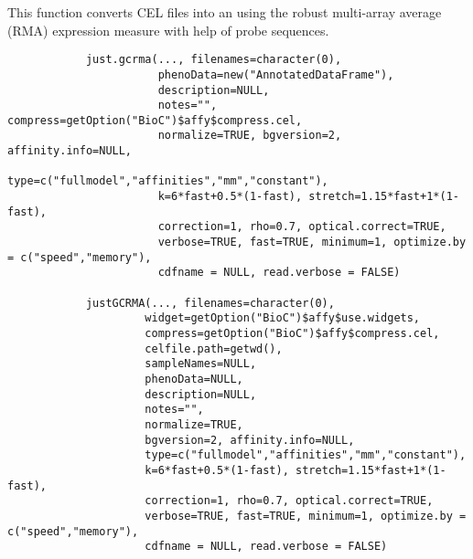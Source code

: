 \begin{Description}\relax
This function converts CEL files into an 
using the robust multi-array average (RMA) expression measure with help of probe sequences.
\end{Description}
\begin{Usage}
\begin{verbatim}
            just.gcrma(..., filenames=character(0),
                       phenoData=new("AnnotatedDataFrame"),
                       description=NULL,
                       notes="", compress=getOption("BioC")$affy$compress.cel,
                       normalize=TRUE, bgversion=2, affinity.info=NULL,
                       type=c("fullmodel","affinities","mm","constant"),
                       k=6*fast+0.5*(1-fast), stretch=1.15*fast+1*(1-fast),
                       correction=1, rho=0.7, optical.correct=TRUE,
                       verbose=TRUE, fast=TRUE, minimum=1, optimize.by = c("speed","memory"),
                       cdfname = NULL, read.verbose = FALSE)

            justGCRMA(..., filenames=character(0),
                     widget=getOption("BioC")$affy$use.widgets,
                     compress=getOption("BioC")$affy$compress.cel,
                     celfile.path=getwd(),
                     sampleNames=NULL,
                     phenoData=NULL,
                     description=NULL,
                     notes="",
                     normalize=TRUE, 
                     bgversion=2, affinity.info=NULL,
                     type=c("fullmodel","affinities","mm","constant"),
                     k=6*fast+0.5*(1-fast), stretch=1.15*fast+1*(1-fast),
                     correction=1, rho=0.7, optical.correct=TRUE,
                     verbose=TRUE, fast=TRUE, minimum=1, optimize.by = c("speed","memory"),
                     cdfname = NULL, read.verbose = FALSE)
\end{verbatim}
\end{Usage}
